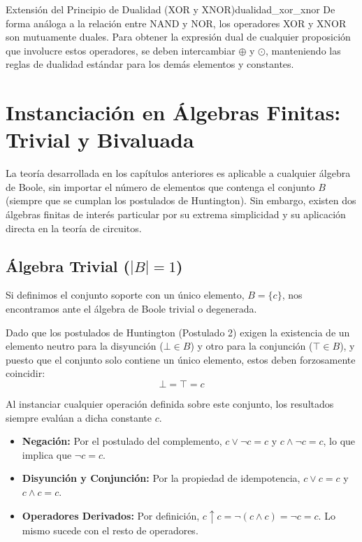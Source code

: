 \documentclass[12pt,a4paper]{article}
\begin{document}
\begin{teorema}{Extensión del Principio de Dualidad (XOR y XNOR)}{dualidad_xor_xnor}
De forma análoga a la relación entre NAND y NOR, los operadores XOR y XNOR son mutuamente duales. Para obtener la expresión dual de cualquier proposición que involucre estos operadores, se deben intercambiar $\oplus$ y $\odot$, manteniendo las reglas de dualidad estándar para los demás elementos y constantes.
\end{teorema}

\section{Instanciación en Álgebras Finitas: Trivial y Bivaluada}

La teoría desarrollada en los capítulos anteriores es aplicable a cualquier álgebra de Boole, sin importar el número de elementos que contenga el conjunto $B$ (siempre que se cumplan los postulados de Huntington). Sin embargo, existen dos álgebras finitas de interés particular por su extrema simplicidad y su aplicación directa en la teoría de circuitos.

\subsection{Álgebra Trivial ($|B| = 1$)}
Si definimos el conjunto soporte con un único elemento, $B = \{ c \}$, nos encontramos ante el álgebra de Boole trivial o degenerada. 

Dado que los postulados de Huntington (Postulado 2) exigen la existencia de un elemento neutro para la disyunción ($\bot \in B$) y otro para la conjunción ($\top \in B$), y puesto que el conjunto solo contiene un único elemento, estos deben forzosamente coincidir:
\[ \bot = \top = c \]

Al instanciar cualquier operación definida sobre este conjunto, los resultados siempre evalúan a dicha constante $c$. 
\begin{itemize}
    \item \textbf{Negación:} Por el postulado del complemento, $c \vee \neg c = c$ y $c \wedge \neg c = c$, lo que implica que $\neg c = c$.
    \item \textbf{Disyunción y Conjunción:} Por la propiedad de idempotencia, $c \vee c = c$ y $c \wedge c = c$.
    \item \textbf{Operadores Derivados:} Por definición, $c \uparrow c = \neg (c \wedge c) = \neg c = c$. Lo mismo sucede con el resto de operadores.
\end{itemize}
\end{document}

